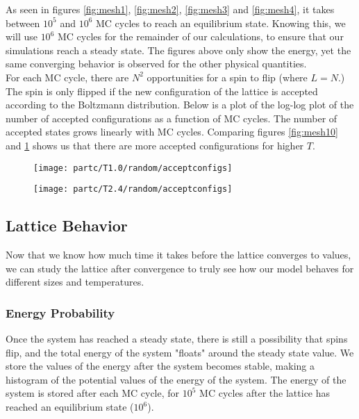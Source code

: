 \documentclass[a4paper]{article}
\begin{document}
As seen in figures \ref{fig:mesh1}, \ref{fig:mesh2}, \ref{fig:mesh3} and \ref{fig:mesh4}, it takes between $10^5$ and $10^6$ MC cycles to reach an equilibrium state. Knowing this, we will use $10^6$ MC cycles for the remainder of our calculations, to ensure that our simulations reach a steady state. The figures above only show the energy, yet the same converging  behavior is observed for the other physical quantities.\\

For each MC cycle, there are $N^2$ opportunities for a spin to flip (where $L=N$.) The spin is only flipped if the new configuration of the lattice is accepted according to the Boltzmann distribution. Below is a plot of the log-log plot of the number of accepted configurations as a function of MC cycles. The number of accepted states grows linearly with MC cycles. Comparing figures \ref{fig:mesh10} and \ref{fig:mesh24} shows us that there are more accepted configurations for higher $T$.

\begin{figure}[ht!]
\centering
\begin{minipage}[t]{0.45\textwidth}
\centering
\texttt{[image: partc/T1.0/random/acceptconfigs]}
\label{fig:mesh10}
\end{minipage}
\begin{minipage}[t]{0.45\textwidth}
\centering
\texttt{[image: partc/T2.4/random/acceptconfigs]}
\label{fig:mesh24}
\end{minipage}
\end{figure}

 

\clearpage
\subsection{Lattice Behavior}

Now that we know how much time it takes before the lattice converges to values, we can study the lattice after convergence to truly see how our model behaves for different sizes and temperatures.

\subsubsection{Energy Probability}
Once the system has reached a steady state, there is still a possibility that spins flip, and the total energy of the system "floats" around the steady state value. We store the values of the energy after the system becomes stable, making a histogram of the potential values of the energy of the system. The energy of the system is stored after each MC cycle, for $10^5$ MC cycles after the lattice has reached an equilibrium state ($10^6$). 
\end{document}
